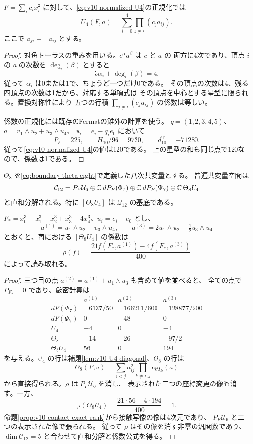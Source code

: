 \begin{lemma}[四次単元の対角三次式への制限]
\label{lem:v10-U4-diagonal}
$F=\sum_i c_i x_i^3$ に対して、\eqref{eq:v10-normalized-U4}の正規化では
\[
 U_4(F,a)=\sum_{i=0}^4\prod_{j\ne i}(c_j a_{ij}).
\]
ここで $a_{ji}=-a_{ij}$ とする。
\end{lemma}
\begin{proof}
対角トーラスの重みを用いる。$c^\alpha a^\beta$ は $c$ と $a$ の
両方に4次であり、頂点 $i$ の $a$ の次数を $\deg_i(\beta)$ とすると
\[
 3\alpha_i+\deg_i(\beta)=4.
\]
従って $\alpha_i$ は0または1で、ちょうど一つだけ0である。
その頂点の次数は4、残る四頂点の次数は1だから、対応する単項式は
その頂点を中心とする星型に限られる。置換対称性により
五つの行積 $\prod_{j\ne i}(c_j a_{ij})$ の係数は等しい。

係数の正規化には既存のFermatの錐外の計算を使う。
$q=(1,2,3,4,5)$、$a=u_1\wedge u_2+u_3\wedge u_4$、
$u_i=e_i-q_i e_0$ において
\[
 P_F=225,\qquad H_{10}/96=9720,\qquad
 d^{\mathrm T}_{10}=-71280.
\]
従って\eqref{eq:v10-normalized-U4}の値は120である。
上の星型の和も同じ点で120なので、係数は1である。
\end{proof}

\begin{theorem}[12次商の生成元と係数汎関数]
\label{thm:v10-twelfth-generator}
$\Theta_8$ を\eqref{eq:boundary-theta-eight}で定義した八次共変量とする。
普遍共変量空間は
\[
 \mathcal C_{12}
 =P_F\mathcal U_6
   \oplus\mathbb C\,dP_F(\Phi_7)
   \oplus\mathbb C\,dP_F(\Psi_7)
   \oplus\mathbb C\,\Theta_8U_4
\]
と直和分解される。特に $[\Theta_8U_4]$ は $\mathcal Q_{12}$ の基底である。

$F_*=x_0^3+x_1^3+x_2^3+x_3^3-4x_4^3$、$u_i=e_i-e_0$ とし、
\[
 a^{(1)}=u_1\wedge u_2+u_3\wedge u_4,\qquad
 a^{(3)}=2u_1\wedge u_2+\tfrac12u_3\wedge u_4
\]
とおくと、商における $[\Theta_8U_4]$ の係数は
\begin{equation}\label{eq:v10-rho-functional}
 \rho(f)=\frac{21f(F_*,a^{(1)})-4f(F_*,a^{(3)})}{400}
\end{equation}
によって読み取れる。
\end{theorem}
\begin{proof}
三つ目の点 $a^{(2)}=a^{(1)}+u_1\wedge u_3$ も含めて値を並べると、
全ての点で $P_{F_*}=0$ であり、厳密計算は
\[
\begin{array}{c|rrr}
 &a^{(1)}&a^{(2)}&a^{(3)}\\\hline
 dP(\Phi_7)&-6137/50&-166211/600&-128877/200\\
 dP(\Psi_7)&0&-48&0\\
 U_4&-4&0&-4\\
 \Theta_8&-14&-26&-97/2\\
 \Theta_8U_4&56&0&194
\end{array}
\]
を与える。$U_4$ の行は補題\ref{lem:v10-U4-diagonal}、$\Theta_8$ の行は
\[
 \Theta_8(F,a)=\sum_{i<j}a_{ij}^2\prod_{k\ne i,j}c_kq_k(a)
\]
から直接得られる。$\rho$ は $P_F\mathcal U_6$ を消し、
表示された二つの座標変更の像も消す。一方、
\[
 \rho(\Theta_8U_4)=\frac{21\cdot56-4\cdot194}{400}=1.
\]
命題\ref{prop:v10-contact-exact-rank}から接触写像の像は4次元であり、
$P_F\mathcal U_6$ と二つの表示された像で張られる。
従って $\rho$ はその像を消す非零の汎関数であり、
$\dim\mathcal C_{12}=5$ と合わせて直和分解と係数公式を得る。
\end{proof}

